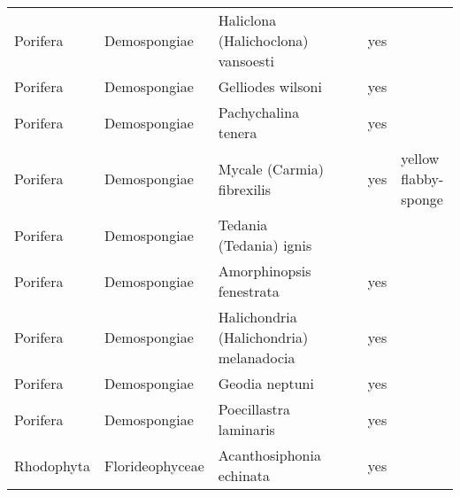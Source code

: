 \begin{longtable}{lllllll}
  Porifera & Demospongiae & Haliclona (Halichoclona) vansoesti &  &  & yes &  \\ 
  Porifera & Demospongiae & Gelliodes wilsoni &  &  & yes &  \\ 
  Porifera & Demospongiae & Pachychalina tenera &  &  & yes &  \\ 
  Porifera & Demospongiae & Mycale (Carmia) fibrexilis &  &  & yes & yellow flabby-sponge \\ 
  Porifera & Demospongiae & Tedania (Tedania) ignis &  &  &  &  \\ 
  Porifera & Demospongiae & Amorphinopsis fenestrata &  &  & yes &  \\ 
  Porifera & Demospongiae & Halichondria (Halichondria) melanadocia &  &  & yes &  \\ 
  Porifera & Demospongiae & Geodia neptuni &  &  & yes &  \\ 
  Porifera & Demospongiae & Poecillastra laminaris &  &  & yes &  \\ 
  Rhodophyta & Florideophyceae & Acanthosiphonia echinata &  &  & yes &  \\ 
  \hline
\end{longtable}
\endgroup
